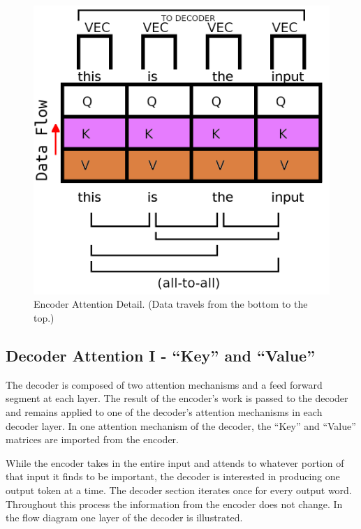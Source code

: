 \begin{figure}[H]
	\begin{center}
		
		
		\includegraphics[scale=0.75]{diagram-graph-encoder-flow-b}
	\end{center}
	\caption[Encoder Attention Detail]{Encoder Attention Detail. (Data travels from the bottom to the top.)}
	
	
\end{figure}

\subsection{Decoder Attention I - ``Key'' and ``Value''}
The decoder is composed of two attention mechanisms and a feed forward segment at each layer. The result of the encoder's work is passed to the decoder and remains applied to one of the decoder's attention mechanisms in each decoder layer. In one attention mechanism of the decoder, the ``Key'' and ``Value'' matrices are imported from the encoder. 

While the encoder takes in the entire input and attends to whatever portion of that input it finds to be important, the decoder is interested in producing one output token at a time. The decoder section iterates once for every output word. Throughout this process the information from the encoder does not change. In the flow diagram one layer of the decoder is illustrated.

